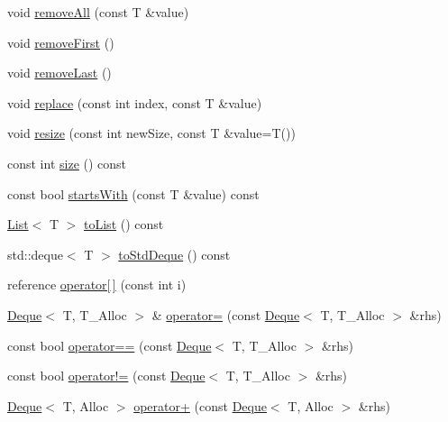 \begin{DoxyCompactItemize}
\item 
void \hyperlink{namespaceprism_1_1aux_abfcfeb5f557b9a5e43a7d519916aa39d}{remove\+All} (const T \&value)
\item 
void \hyperlink{namespaceprism_1_1aux_ae062b2489c5805ab0bd0e4554d13bfab}{remove\+First} ()
\item 
void \hyperlink{namespaceprism_1_1aux_a4a7132c68a0630f19d5f1ab7f1edcb12}{remove\+Last} ()
\item 
void \hyperlink{namespaceprism_1_1aux_a0091a7927530194b1865a0d589051a31}{replace} (const int index, const T \&value)
\item 
void \hyperlink{namespaceprism_1_1aux_a8e3057a0062697028ad44d13040dfcca}{resize} (const int new\+Size, const T \&value=T())
\item 
const int \hyperlink{namespaceprism_1_1aux_a7311aa21cf3af7c4639ea15e4716de1b}{size} () const 
\item 
const bool \hyperlink{namespaceprism_1_1aux_a8cb92aad56edf97b5d59f9e27bbfcd1b}{starts\+With} (const T \&value) const 
\item 
\hyperlink{classprism_1_1_list}{List}$<$ T $>$ \hyperlink{namespaceprism_1_1aux_aab9a10fe56f665939851e853c57b540f}{to\+List} () const 
\item 
std\+::deque$<$ T $>$ \hyperlink{namespaceprism_1_1aux_af32f26702badfa3660a9a21c817bc1e1}{to\+Std\+Deque} () const 
\item 
reference \hyperlink{namespaceprism_1_1aux_a402922b74094cc44cc5fd647de7db684}{operator\mbox{[}$\,$\mbox{]}} (const int i)
\item 
\hyperlink{namespaceprism_1_1aux_a73d05f9bac6f1390e68c9ca400dd90b7}{Deque}$<$ T, T\+\_\+\+Alloc $>$ \& \hyperlink{namespaceprism_1_1aux_a77dcc2dac220e07c992a00ca9362224a}{operator=} (const \hyperlink{namespaceprism_1_1aux_a73d05f9bac6f1390e68c9ca400dd90b7}{Deque}$<$ T, T\+\_\+\+Alloc $>$ \&rhs)
\item 
const bool \hyperlink{namespaceprism_1_1aux_a5bb25d34954faecf07bae75666bc932f}{operator==} (const \hyperlink{namespaceprism_1_1aux_a73d05f9bac6f1390e68c9ca400dd90b7}{Deque}$<$ T, T\+\_\+\+Alloc $>$ \&rhs)
\item 
const bool \hyperlink{namespaceprism_1_1aux_a4f4f52e5988acc4c64eb93a760d9919e}{operator!=} (const \hyperlink{namespaceprism_1_1aux_a73d05f9bac6f1390e68c9ca400dd90b7}{Deque}$<$ T, T\+\_\+\+Alloc $>$ \&rhs)
\item 
\hyperlink{namespaceprism_1_1aux_a73d05f9bac6f1390e68c9ca400dd90b7}{Deque}$<$ T, Alloc $>$ \hyperlink{namespaceprism_1_1aux_af88b6a1b09b63435d562fbc987badea3}{operator+} (const \hyperlink{namespaceprism_1_1aux_a73d05f9bac6f1390e68c9ca400dd90b7}{Deque}$<$ T, Alloc $>$ \&rhs)

\end{DoxyCompactItemize}
